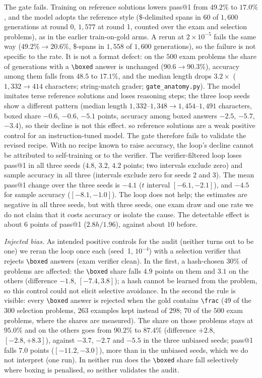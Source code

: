 \documentclass[runningheads]{llncs}
\begin{document}
The gate fails. Training on reference solutions lowers pass@1 from $49.2\%$ to
$17.0\%$, and the model adopts the reference style ($\$$-delimited spans in
$60$ of $1{,}600$ generations at round 0, $1{,}577$ at round 1, counted over the
exam and selection problems), as in the earlier train-on-gold arms. A
rerun at $2\times10^{-5}$ fails the same way ($49.2\%\to20.6\%$, $\$$-spans in $1{,}558$ of
$1{,}600$ generations), so the failure is not specific to the rate. It is not a format defect: on the $500$ exam problems the share of generations with a
\verb|\boxed| answer is unchanged ($90.6\to90.3\%$), accuracy among them falls from $48.5$ to
$17.1\%$, and the median length drops $3.2\times$ ($1{,}332\to414$ characters; string-match grader; \texttt{gate\_anatomy.py}).
The model imitates terse reference solutions and loses reasoning steps; the three loop seeds show a different pattern (median length $1{,}332$--$1{,}348\to1{,}454$--$1{,}491$ characters, boxed share $-0.6$, $-0.6$, $-5.1$ points, accuracy among boxed answers $-2.5$, $-5.7$, $-3.4$), so their decline is not this effect. so reference solutions are a weak positive control for an instruction-tuned model. The gate therefore fails to validate the
revised recipe. With no recipe known to
raise accuracy, the loop's decline cannot be attributed to self-training or to the verifier. The verifier-filtered
loop loses pass@1 in all three seeds ($4.8$, $3.2$, $4.2$ points; two intervals exclude zero) and
sample accuracy in all three (intervals exclude zero for seeds 2 and 3). The mean pass@1 change over the three seeds is $-4.1$ ($t$ interval
$[-6.1,-2.1]$), and $-4.5$ for sample accuracy ($[-8.1,-1.0]$). The loop does not
help; the estimates are negative in all three seeds, but with three seeds, one
exam draw and one rate we do not claim that it costs accuracy or isolate the cause. The detectable effect
is about $6$ points of pass@1 ($2.8h/1.96$), against about $10$ before.

\emph{Injected bias.} As intended positive controls for the audit (neither turns out to be one) we reran the loop once
each (seed~1, $10^{-4}$) with a selection verifier that rejects \verb|\boxed|
answers (exam verifier clean). In the first, a hash-chosen $30\%$ of problems are
affected: the \verb|\boxed| share falls $4.9$ points on them and $3.1$ on the others
(difference $-1.8$, $[-7.4,3.8]$); a hash cannot be learned from the problem, so this
control could not elicit selective avoidance. In the second the rule is visible: every
\verb|\boxed| answer is rejected when the gold contains \verb|\frac| ($49$ of the $300$ selection
problems, $263$ examples kept instead of $298$; $70$ of the $500$ exam problems, where the shares are measured). The share on those problems stays at
$95.0\%$ and on the others goes from $90.2\%$ to $87.4\%$ (difference $+2.8$,
$[-2.8,+8.3]$), against $-3.7$, $-2.7$ and $-5.5$ in the three unbiased
seeds; pass@1 falls $7.0$ points ($[-11.2,-3.0]$),
more than in the unbiased seeds, which we do not interpret (one run). In neither run does the
\verb|\boxed| share fall selectively where boxing is penalised, so neither
validates the audit.
\end{document}

